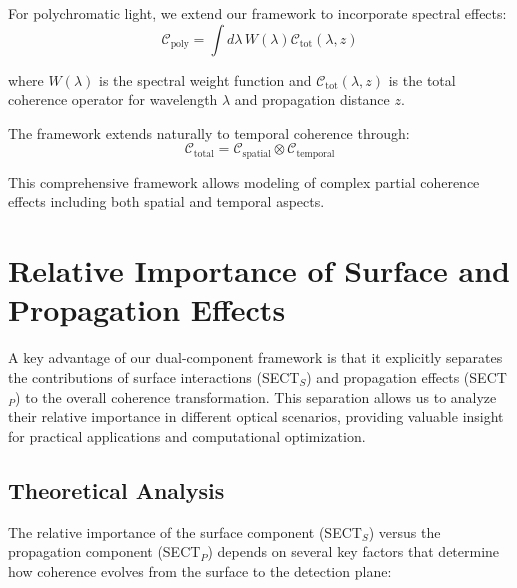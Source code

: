 \documentclass[a4paper,12pt]{article}
\begin{document}
For polychromatic light, we extend our framework to incorporate spectral effects:
\begin{equation}
\mathcal{C}_{\text{poly}} = \int d\lambda \, W(\lambda) \mathcal{C}_{\text{tot}}(\lambda, z)
\end{equation}

where $W(\lambda)$ is the spectral weight function and $\mathcal{C}_{\text{tot}}(\lambda, z)$ is the total coherence operator for wavelength $\lambda$ and propagation distance $z$.

The framework extends naturally to temporal coherence through:
\begin{equation}
\mathcal{C}_{\text{total}} = \mathcal{C}_{\text{spatial}} \otimes \mathcal{C}_{\text{temporal}}
\end{equation}

This comprehensive framework allows modeling of complex partial coherence effects including both spatial and temporal aspects.


\section{Relative Importance of Surface and Propagation Effects} \label{sec:relative_importance}

A key advantage of our dual-component framework is that it explicitly separates the contributions of surface interactions (SECT$_S$) and propagation effects (SECT$_P$) to the overall coherence transformation. This separation allows us to analyze their relative importance in different optical scenarios, providing valuable insight for practical applications and computational optimization.

\subsection{Theoretical Analysis}

The relative importance of the surface component (SECT$_S$) versus the propagation component (SECT$_P$) depends on several key factors that determine how coherence evolves from the surface to the detection plane:
\end{document}
